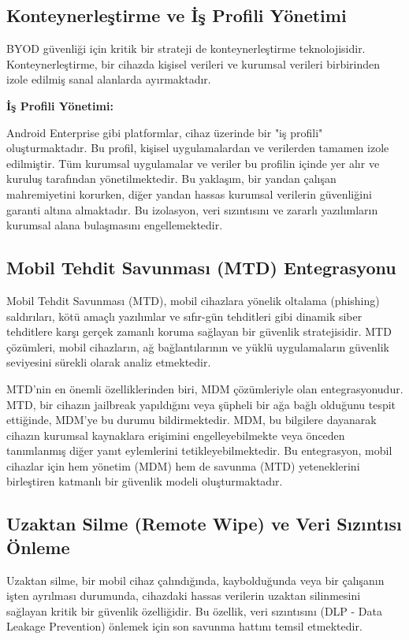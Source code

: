 \subsection{Konteynerleştirme ve İş Profili Yönetimi}

BYOD güvenliği için kritik bir strateji de konteynerleştirme teknolojisidir. Konteynerleştirme, bir cihazda kişisel verileri ve kurumsal verileri birbirinden izole edilmiş sanal alanlarda ayırmaktadır.

\textbf{İş Profili Yönetimi:}

Android Enterprise gibi platformlar, cihaz üzerinde bir "iş profili" oluşturmaktadır. Bu profil, kişisel uygulamalardan ve verilerden tamamen izole edilmiştir. Tüm kurumsal uygulamalar ve veriler bu profilin içinde yer alır ve kuruluş tarafından yönetilmektedir. Bu yaklaşım, bir yandan çalışan mahremiyetini korurken, diğer yandan hassas kurumsal verilerin güvenliğini garanti altına almaktadır. Bu izolasyon, veri sızıntısını ve zararlı yazılımların kurumsal alana bulaşmasını engellemektedir.

\subsection{Mobil Tehdit Savunması (MTD) Entegrasyonu}

Mobil Tehdit Savunması (MTD), mobil cihazlara yönelik oltalama (phishing) saldırıları, kötü amaçlı yazılımlar ve sıfır-gün tehditleri gibi dinamik siber tehditlere karşı gerçek zamanlı koruma sağlayan bir güvenlik stratejisidir. MTD çözümleri, mobil cihazların, ağ bağlantılarının ve yüklü uygulamaların güvenlik seviyesini sürekli olarak analiz etmektedir.

MTD'nin en önemli özelliklerinden biri, MDM çözümleriyle olan entegrasyonudur. MTD, bir cihazın jailbreak yapıldığını veya şüpheli bir ağa bağlı olduğunu tespit ettiğinde, MDM'ye bu durumu bildirmektedir. MDM, bu bilgilere dayanarak cihazın kurumsal kaynaklara erişimini engelleyebilmekte veya önceden tanımlanmış diğer yanıt eylemlerini tetikleyebilmektedir. Bu entegrasyon, mobil cihazlar için hem yönetim (MDM) hem de savunma (MTD) yeteneklerini birleştiren katmanlı bir güvenlik modeli oluşturmaktadır.

\subsection{Uzaktan Silme (Remote Wipe) ve Veri Sızıntısı Önleme}

Uzaktan silme, bir mobil cihaz çalındığında, kaybolduğunda veya bir çalışanın işten ayrılması durumunda, cihazdaki hassas verilerin uzaktan silinmesini sağlayan kritik bir güvenlik özelliğidir. Bu özellik, veri sızıntısını (DLP - Data Leakage Prevention) önlemek için son savunma hattını temsil etmektedir.

